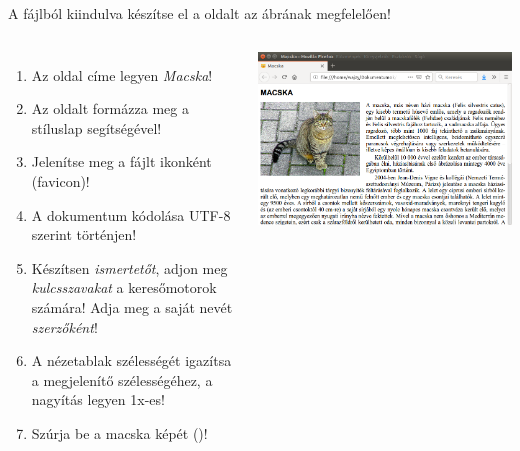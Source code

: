 \begin{frame}
  A  fájlból kiindulva készítse el a  oldalt az ábrának megfelelően!
  \begin{columns}[c]
      \begin{enumerate}
        \item Az oldal címe legyen \emph{Macska}!
        \item Az oldalt formázza meg a  stíluslap segítségével!
        \item Jelenítse meg a  fájlt ikonként (favicon)!
        \item A dokumentum kódolása UTF-8 szerint történjen!
        \item Készítsen \emph{ismertetőt}, adjon meg \emph{kulcsszavakat} a keresőmotorok számára! Adja meg a saját nevét \emph{szerzőként}!
        \item A nézetablak szélességét igazítsa a megjelenítő szélességéhez, a nagyítás legyen 1x-es!
        \item Szúrja be a macska képét ()!
      \end{enumerate}      
      \includegraphics[width=\textwidth]{macska_screenshot.png}
  \end{columns} 
\end{frame}
